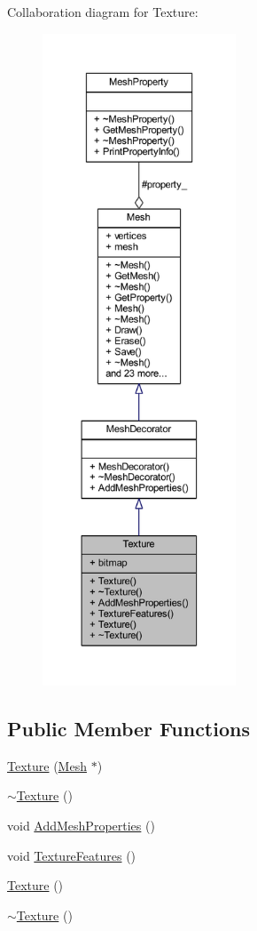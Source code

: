 Collaboration diagram for Texture\+:\nopagebreak
\begin{figure}[H]
\begin{center}
\leavevmode
\includegraphics[height=550pt]{class_texture__coll__graph}
\end{center}
\end{figure}
\subsection*{Public Member Functions}
\begin{DoxyCompactItemize}
\item 
\mbox{\hyperlink{class_texture_a6d13acc5d63187bb129f28d29f9a794f}{Texture}} (\mbox{\hyperlink{class_mesh}{Mesh}} $\ast$)
\item 
\mbox{\hyperlink{class_texture_a09c4bcb7462f64c1d20fa69dba3cee8a}{$\sim$\+Texture}} ()
\item 
void \mbox{\hyperlink{class_texture_aa7e2f179b2117c32e03e38fdc0f85290}{Add\+Mesh\+Properties}} ()
\item 
void \mbox{\hyperlink{class_texture_a8bd22c7780366ad3101d0f40df374866}{Texture\+Features}} ()
\item 
\mbox{\hyperlink{class_texture_a6c275e3f186675ff6ed73ccf970e552f}{Texture}} ()
\item 
\mbox{\hyperlink{class_texture_a09c4bcb7462f64c1d20fa69dba3cee8a}{$\sim$\+Texture}} ()
\end{DoxyCompactItemize}
